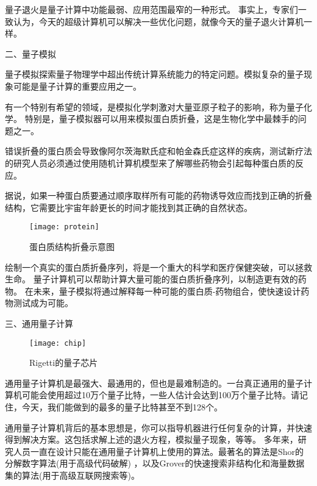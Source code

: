 \documentclass{hfutpaper}
\begin{document}
量子退火是量子计算中功能最弱、应用范围最窄的一种形式。
事实上，专家们一致认为，今天的超级计算机可以解决一些优化问题，就像今天的量子退火计算机一样。

二、量子模拟

量子模拟探索量子物理学中超出传统计算系统能力的特定问题。模拟复杂的量子现象可能是量子计算的重要应用之一。

有一个特别有希望的领域，是模拟化学刺激对大量亚原子粒子的影响，称为量子化学。
特别是，量子模拟器可以用来模拟蛋白质折叠，这是生物化学中最棘手的问题之一。

错误折叠的蛋白质会导致像阿尔茨海默氏症和帕金森氏症这样的疾病，测试新疗法的研究人员必须通过使用随机计算机模型来了解哪些药物会引起每种蛋白质的反应。

据说，如果一种蛋白质要通过顺序取样所有可能的药物诱导效应而找到正确的折叠结构，它需要比宇宙年龄更长的时间才能找到其正确的自然状态。

\begin{figure}[H]%
	\centering  %
	\texttt{[image: protein]}  %
	\caption{蛋白质结构折叠示意图}  %
	\label{fig1}
\end{figure}

绘制一个真实的蛋白质折叠序列，将是一个重大的科学和医疗保健突破，可以拯救生命。
量子计算机可以帮助计算大量可能的蛋白质折叠序列，以制造更有效的药物。 在未来，量子模拟将通过解释每一种可能的蛋白质-药物组合，使快速设计药物测试成为可能。

三、通用量子计算

\begin{figure}[H]%
	\centering  %
	\texttt{[image: chip]}  %
	\caption{Rigetti的量子芯片}  %
	\label{fig1}
\end{figure}

通用量子计算机是最强大、最通用的，但也是最难制造的。一台真正通用的量子计算机可能会使用超过10万个量子比特，一些人估计会达到100万个量子比特。请记住，今天，我们能做到的最多的量子比特甚至不到128个。

通用量子计算机背后的基本思想是，你可以指导机器进行任何复杂的计算，并快速得到解决方案。这包括求解上述的退火方程，模拟量子现象，等等。
多年来，研究人员一直在设计只能在通用量子计算机上使用的算法。最著名的算法是Shor的分解数字算法(用于高级代码破解) ，以及Grover的快速搜索非结构化和海量数据集的算法(用于高级互联网搜索等)。
\end{document}
